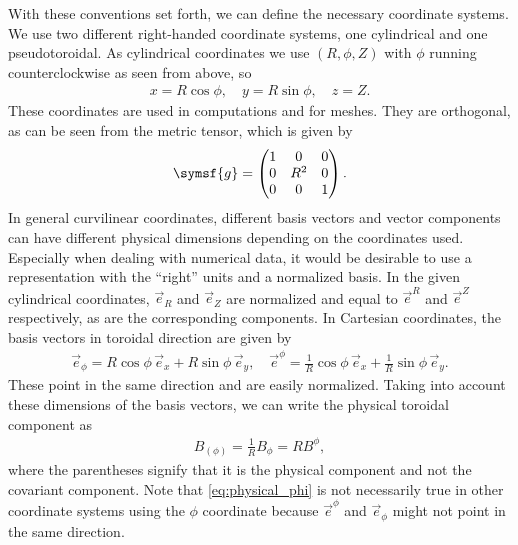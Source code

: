 With these conventions set forth, we can define the necessary coordinate systems. We use two different right-handed coordinate systems, one cylindrical and one pseudotoroidal. As cylindrical coordinates we use $(R, \phi, Z)$ with $\phi$ running counterclockwise as seen from above, so
\begin{gather}
  x = R \cos \phi, \quad y = R \sin \phi, \quad z = Z.
\end{gather}
These coordinates are used in computations and for meshes. They are orthogonal, as can be seen from the metric tensor, which is given by
\begin{gather}
  \symsf{g} = \begin{pmatrix}
    1 & 0 & 0 \\
    0 & R^{2} & 0 \\
    0 & 0 & 1
  \end{pmatrix}.
\end{gather}
In general curvilinear coordinates, different basis vectors and vector components can have different physical dimensions depending on the coordinates used. Especially when dealing with numerical data, it would be desirable to use a representation with the \enquote{right} units and a normalized basis. In the given cylindrical coordinates, $\vec{e}_{R}$ and $\vec{e}_{Z}$ are normalized and equal to $\vec{e}^{R}$ and $\vec{e}^{Z}$ respectively, as are the corresponding components. In Cartesian coordinates, the basis vectors in toroidal direction are given by
\begin{gather}
  \vec{e}_{\phi} = R \cos \phi \, \vec{e}_{x} + R \sin \phi \, \vec{e}_{y}, \quad \vec{e}^{\phi} = \frac{1}{R} \cos \phi \, \vec{e}_{x} + \frac{1}{R} \sin \phi \, \vec{e}_{y}.
\end{gather}
These point in the same direction and are easily normalized. Taking into account these dimensions of the basis vectors, we can write the physical toroidal component as
\begin{gather}
  B_{(\phi)} = \frac{1}{R} B_{\phi} = R B^{\phi}, \label{eq:physical_phi}
\end{gather}
where the parentheses signify that it is the physical component and not the covariant component. Note that \cref{eq:physical_phi} is not necessarily true in other coordinate systems using the $\phi$ coordinate because $\vec{e}^{\phi}$ and $\vec{e}_{\phi}$ might not point in the same direction.


